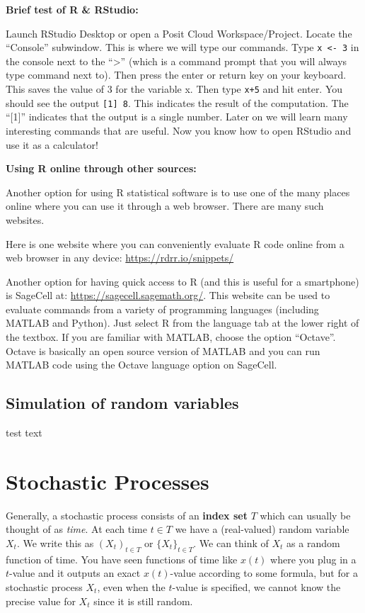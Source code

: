 \documentclass[
]{article}
\begin{document}
\textbf{Brief test of R \& RStudio:}

Launch RStudio Desktop or open a Posit Cloud Workspace/Project. Locate the ``Console'' subwindow. This is where we will type our commands. Type \texttt{x\ \textless{}-\ 3} in the console next to the ``\textgreater{}'' (which is a command prompt that you will always type command next to). Then press the enter or return key on your keyboard. This saves the value of 3 for the variable x. Then type \texttt{x+5} and hit enter. You should see the output \texttt{{[}1{]}\ 8}. This indicates the result of the computation. The ``{[}1{]}'' indicates that the output is a single number. Later on we will learn many interesting commands that are useful.
Now you know how to open RStudio and use it as a calculator!

\textbf{Using R online through other sources:}

Another option for using R statistical software is to use one of the many places online where you can use it through a web browser.
There are many such websites.

Here is one website where you can conveniently evaluate R code online from a web browser in any device: \url{https://rdrr.io/snippets/}

Another option for having quick access to R (and this is useful for a smartphone) is SageCell at: \url{https://sagecell.sagemath.org/}.
This website can be used to evaluate commands from a variety of programming languages (including MATLAB and Python).
Just select R from the language tab at the lower right of the textbox.
If you are familiar with MATLAB, choose the option ``Octave''.
Octave is basically an open source version of MATLAB and you can run MATLAB code using the Octave language option on SageCell.

\hypertarget{simulation-of-random-variables}{%
\subsection{Simulation of random variables}\label{simulation-of-random-variables}}

test text

\hypertarget{stochastic-processes}{%
\section{Stochastic Processes}\label{stochastic-processes}}

Generally, a stochastic process consists of an \textbf{index set} \(T\) which
can usually be thought of as \emph{time}. At each time \(t\in T\) we have a
(real-valued) random variable \(X_t\). We write this as \((X_t)_{t\in T}\)
or \(\{X_t\}_{t\in T}\). We can think of \(X_t\) as a random function of
time. You have seen functions of time like \(x(t)\) where you plug in a
\(t\)-value and it outputs an exact \(x(t)\)-value according to some
formula, but for a stochastic process \(X_t\), even when the \(t\)-value is
specified, we cannot know the precise value for \(X_t\) since it is still
random.
\end{document}
